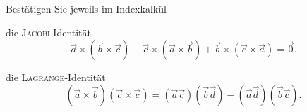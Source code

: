 \begin{atiTask}[
  title = Die Identitäten von JACOBI und LAGRANGE
]
Bestätigen Sie jeweils im Indexkalkül 
\begin{atiSubtasks}
\item die \textsc{Jacobi}-Identität
\[\vec{a}\times (\vec{b}\times \vec{c})+\vec{c}\times (\vec{a}\times \vec{b})+\vec{b}\times (\vec{c}\times \vec{a})=\vec{0}.
\]
\item die \textsc{Lagrange}-Identität
\[(\vec{a}\times \vec{b})(\vec{c}\times \vec{c})=(\vec{a}\vec{c})(\vec{b}\vec{d})-(\vec{a}\vec{d})(\vec{b}\vec{c}).
\]
\end{atiSubtasks}



\end{atiTask}

\begin{atiSolution}
	
\end{atiSolution}